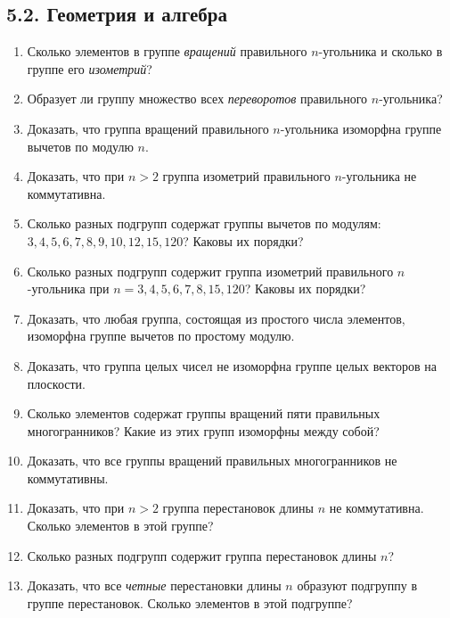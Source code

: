 	\subsection{5.2. Геометрия и алгебра}
	\begin{enumerate}
		\item Сколько элементов в группе \textit{вращений} правильного $n$-угольника и сколько в группе его \textit{изометрий}?

		\item Образует ли группу множество всех \textit{переворотов} правильного $n$-угольника?

		\item Доказать, что группа вращений правильного $n$-угольника изоморфна группе вычетов по модулю $n$.

		\item Доказать, что при $n > 2$ группа изометрий правильного $n$-угольника не коммутативна.

		\item Сколько разных подгрупп содержат группы вычетов по модулям: $3, 4, 5, 6, 7, 8, 9, 10, 12, 15, 120$? Каковы их порядки?

		\item Сколько разных подгрупп содержит группа изометрий правильного $n$-угольника при $n = 3, 4, 5, 6, 7, 8, 15, 120$? Каковы их порядки?

		\item Доказать, что любая группа, состоящая из простого числа элементов, изоморфна группе вычетов по простому модулю.

		\item Доказать, что группа целых чисел не изоморфна группе целых векторов на плоскости.

		\item Сколько элементов содержат группы вращений пяти правильных многогранников? Какие из этих групп изоморфны между собой?

		\item Доказать, что все группы вращений правильных многогранников не коммутативны.
		
		\item Доказать, что при $n > 2$ группа перестановок длины $n$ не коммутативна. Сколько элементов в этой группе?

		\item Сколько разных подгрупп содержит группа перестановок длины $n$?

		\item Доказать, что все \textit{четные} перестановки длины $n$ образуют подгруппу в группе перестановок. Сколько элементов в этой подгруппе?


\end{enumerate}
